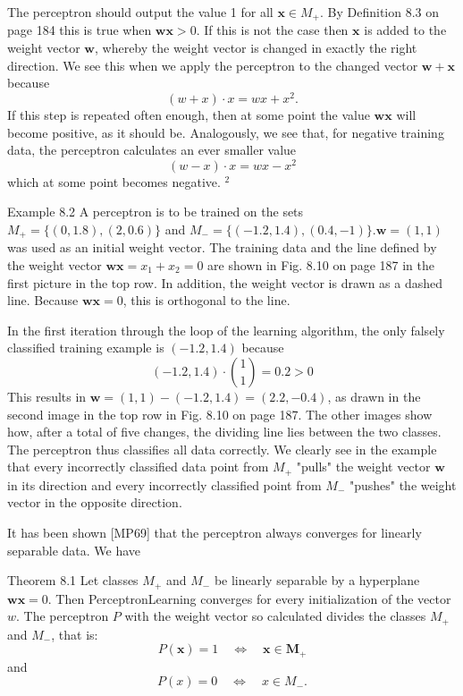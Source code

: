 \documentclass[10pt]{book}
\begin{document}
The perceptron should output the value 1 for all $\boldsymbol{x} \in M_{+}$. By Definition 8.3 on page 184 this is true when $\boldsymbol{w} \boldsymbol{x}>0$. If this is not the case then $\boldsymbol{x}$ is added to the weight vector $\boldsymbol{w}$, whereby the weight vector is changed in exactly the right direction. We see this when we apply the perceptron to the changed vector $\boldsymbol{w}+\boldsymbol{x}$ because
\[
(w+x) \cdot x=w x+x^{2} .
\]
If this step is repeated often enough, then at some point the value $\boldsymbol{w} \boldsymbol{x}$ will become positive, as it should be. Analogously, we see that, for negative training data, the perceptron calculates an ever smaller value
\[
(w-x) \cdot x=w x-x^{2}
\]
which at some point becomes negative. ${ }^{2}$

Example 8.2 A perceptron is to be trained on the sets $M_{+}=\{(0,1.8),(2,0.6)\}$ and $M_{-}=\{(-1.2,1.4),(0.4,-1)\} . \boldsymbol{w}=(1,1)$ was used as an initial weight vector. The training data and the line defined by the weight vector $\boldsymbol{w} \boldsymbol{x}=x_{1}+x_{2}=0$ are shown in Fig. 8.10 on page 187 in the first picture in the top row. In addition, the weight vector is drawn as a dashed line. Because $\boldsymbol{w} \boldsymbol{x}=0$, this is orthogonal to the line.

In the first iteration through the loop of the learning algorithm, the only falsely classified training example is $(-1.2,1.4)$ because
\[
(-1.2,1.4) \cdot\binom{1}{1}=0.2>0
\]
This results in $\boldsymbol{w}=(1,1)-(-1.2,1.4)=(2.2,-0.4)$, as drawn in the second image in the top row in Fig. 8.10 on page 187. The other images show how, after a total of five changes, the dividing line lies between the two classes. The perceptron thus classifies all data correctly. We clearly see in the example that every incorrectly classified data point from $M_{+}$ "pulls" the weight vector $\boldsymbol{w}$ in its direction and every incorrectly classified point from $M_{-}$ "pushes" the weight vector in the opposite direction.

It has been shown [MP69] that the perceptron always converges for linearly separable data. We have

Theorem 8.1 Let classes $M_{+}$ and $M_{-}$ be linearly separable by a hyperplane $\boldsymbol{w} \boldsymbol{x}=0$. Then PerceptronLearning converges for every initialization of the vector $w$. The perceptron $P$ with the weight vector so calculated divides the classes $M_{+}$ and $M_{-}$, that is:
\[
P(\boldsymbol{x})=1 \quad \Leftrightarrow \quad \boldsymbol{x} \in \boldsymbol{M}_{+}
\]
and
\[
P(x)=0 \quad \Leftrightarrow \quad x \in M_{-} .
\]
\end{document}
